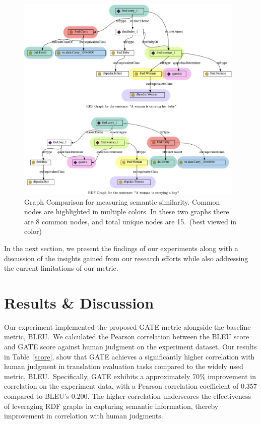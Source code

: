 \documentclass[runningheads]{llncs}
\begin{document}
\begin{figure}[h]
  \centering
  \includegraphics[height=10cm,width=1\linewidth]{figures/graphcompare2.jpg}
  \caption{Graph Comparison for measuring semantic similarity. Common nodes are highlighted in multiple colors. In these two graphs there are 8 common nodes, and total unique nodes are 15.~(best viewed in color)}
  \label{graphcompare}
  \end{figure}










In the next section, we present the findings of our experiments along with a discussion of the insights gained from our research efforts while also addressing the current limitations of our metric.



\section{Results \& Discussion}\label{results}

Our experiment implemented the proposed GATE metric alongside the baseline metric, BLEU.~We calculated the Pearson correlation between the BLEU score and GATE score against human judgment on the experiment dataset. Our results in Table~\ref{score}, show that GATE achieves a significantly higher correlation with human judgment in translation evaluation tasks compared to the widely used metric, BLEU.~Specifically, GATE exhibits a approximately 70\% improvement in correlation on the experiment data, with a Pearson correlation coefficient of 0.357 compared to BLEU's 0.200. The higher correlation underscores the effectiveness of leveraging RDF graphs in capturing semantic information, thereby improvement in correlation with human judgments. 
\end{document}
